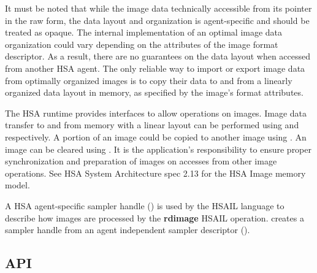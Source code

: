 \documentclass[final]{book}
\newcommand{\reffun}[1]{\textbf{#1}}
\newcommand{\refhsl}[1]{\reffun{#1}}
\begin{document}
It must be noted that while the image data technically accessible from its
pointer in the raw form, the data layout and organization is agent-specific and
should be treated as opaque. The internal implementation of an optimal image
data organization could vary depending on the attributes of the image format
descriptor. As a result, there are no guarantees on the data layout when
accessed from another HSA agent. The only reliable way to import or export image
data from optimally organized images is to copy their data to and from a
linearly organized data layout in memory, as specified by the image's format
attributes.

The HSA runtime provides interfaces to allow operations on images. Image data
transfer to and from memory with a linear layout can be performed using
 and  respectively. A
portion of an image could be copied to another image using
. An image can be cleared using
. It is the application's responsibility to ensure
proper synchronization and preparation of images on accesses from other image
operations. See HSA System Architecture spec 2.13 for the HSA Image memory
model.

A HSA agent-specific sampler handle () is used
by the HSAIL language to describe how images are processed by the
\refhsl{rdimage} HSAIL operation.  creates
a sampler handle from an agent independent sampler descriptor
().

\subsection{API}



\end{document}
